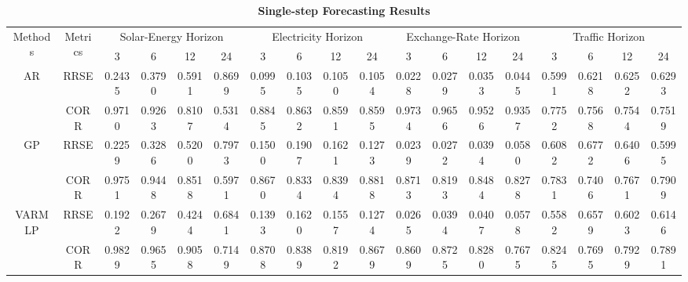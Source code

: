 \documentclass[final,12pt]{elsarticle}
\begin{document}
\begin{landscape}


  \begin{table}[h]  %


  \setlength{\abovecaptionskip}{-2pt}
  \caption{\textbf{Single-step Forecasting Results}}
  \begin{subtable}[h]{0.48\textwidth}
  \label{subtable-4}

  \tiny
  \centering
  \renewcommand{\arraystretch}{1.2}

  \begin{center}  %
  \begin{tabular}{|*{18}{c|}}

    \hline
      \multirow{2}{*}{Methods} 
    & \multirow{2}{*}{Metrics} 
    & \multicolumn{4}{c|}{Solar-Energy Horizon} 
    & \multicolumn{4}{c|}{Electricity Horizon} 
    & \multicolumn{4}{c|}{Exchange-Rate Horizon} 
    & \multicolumn{4}{c|}{Traffic Horizon}  \\

    \cline{3-18}
      & & 3 & 6 & 12 & 24 
        & 3 & 6 & 12 & 24 
        & 3 & 6 & 12 & 24 
        & 3 & 6 & 12 & 24  \\

    \hline
    \multirow{2}{*}{AR}  %
    & RRSE 
    & 0.2435 & 0.3790 & 0.5911 & 0.8699 
    & 0.0995 & 0.1035 & 0.1050 & 0.1054 
    & 0.0228 & 0.0279 & 0.0353 & 0.0445 
    & 0.5991 & 0.6218 & 0.6252 & 0.6293  \\
    \cline{2-18}
    & CORR 
    & 0.9710 & 0.9263 & 0.8107 & 0.5314 
    & 0.8845 & 0.8632 & 0.8591 & 0.8595 
    & 0.9734 & 0.9656 & 0.9526 & 0.9357 
    & 0.7752 & 0.7568 & 0.7544 & 0.7519  \\

    \hline
    \multirow{2}{*}{GP}  %
    & RRSE 
    & 0.2259 & 0.3286 & 0.5200 & 0.7973 
    & 0.1500 & 0.1907 & 0.1621 & 0.1273 
    & 0.0239 & 0.0272 & 0.0394 & 0.0580 
    & 0.6082 & 0.6772 & 0.6406 & 0.5995  \\
    \cline{2-18}
    & CORR 
    & 0.9751 & 0.9448 & 0.8518 & 0.5971 
    & 0.8670 & 0.8334 & 0.8394 & 0.8818 
    & 0.8713 & 0.8193 & 0.8484 & 0.8278 
    & 0.7831 & 0.7406 & 0.7671 & 0.7909  \\

    \hline
    \multirow{2}{*}{VARMLP}  %
    & RRSE 
    & 0.1922 & 0.2679 & 0.4244 & 0.6841 
    & 0.1393 & 0.1620 & 0.1557 & 0.1274 
    & 0.0265 & 0.0394 & 0.0407 & 0.0578 
    & 0.5582 & 0.6579 & 0.6023 & 0.6146  \\
    \cline{2-18}
    & CORR 
    & 0.9829 & 0.9655 & 0.9058 & 0.7149 
    & 0.8708 & 0.8389 & 0.8192 & 0.8679 
    & 0.8609 & 0.8725 & 0.8280 & 0.7675 
    & 0.8245 & 0.7695 & 0.7929 & 0.7891  \\


\end{tabular}
\end{center}
\end{subtable}
\end{table}
\end{landscape}
\end{document}
